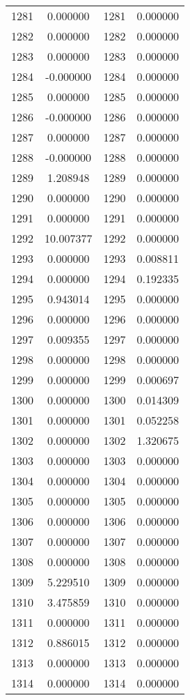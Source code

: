 \documentclass[12pt]{article}
\begin{document}
\begin{longtable}{@{}cccc@{}}
1281 & 0.000000 & 1281 & 0.000000 \\
1282 & 0.000000 & 1282 & 0.000000 \\
1283 & 0.000000 & 1283 & 0.000000 \\
1284 & -0.000000 & 1284 & 0.000000 \\
1285 & 0.000000 & 1285 & 0.000000 \\
1286 & -0.000000 & 1286 & 0.000000 \\
1287 & 0.000000 & 1287 & 0.000000 \\
1288 & -0.000000 & 1288 & 0.000000 \\
1289 & 1.208948 & 1289 & 0.000000 \\
1290 & 0.000000 & 1290 & 0.000000 \\
1291 & 0.000000 & 1291 & 0.000000 \\
1292 & 10.007377 & 1292 & 0.000000 \\
1293 & 0.000000 & 1293 & 0.008811 \\
1294 & 0.000000 & 1294 & 0.192335 \\
1295 & 0.943014 & 1295 & 0.000000 \\
1296 & 0.000000 & 1296 & 0.000000 \\
1297 & 0.009355 & 1297 & 0.000000 \\
1298 & 0.000000 & 1298 & 0.000000 \\
1299 & 0.000000 & 1299 & 0.000697 \\
1300 & 0.000000 & 1300 & 0.014309 \\
1301 & 0.000000 & 1301 & 0.052258 \\
1302 & 0.000000 & 1302 & 1.320675 \\
1303 & 0.000000 & 1303 & 0.000000 \\
1304 & 0.000000 & 1304 & 0.000000 \\
1305 & 0.000000 & 1305 & 0.000000 \\
1306 & 0.000000 & 1306 & 0.000000 \\
1307 & 0.000000 & 1307 & 0.000000 \\
1308 & 0.000000 & 1308 & 0.000000 \\
1309 & 5.229510 & 1309 & 0.000000 \\
1310 & 3.475859 & 1310 & 0.000000 \\
1311 & 0.000000 & 1311 & 0.000000 \\
1312 & 0.886015 & 1312 & 0.000000 \\
1313 & 0.000000 & 1313 & 0.000000 \\
1314 & 0.000000 & 1314 & 0.000000 \\

\end{longtable}
\end{document}
